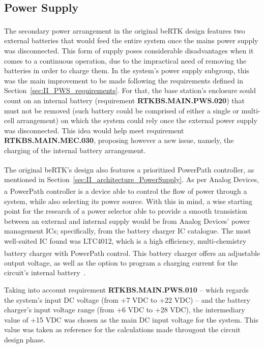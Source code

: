 \subsection{Power Supply}\label{sec:313_PowerSupply}

The secondary power arrangement in the original beRTK\textsuperscript{\textregistered} design features two external batteries that would feed the entire system once the mains power supply was disconnected. This form of supply poses considerable disadvantages when it comes to a continuous operation, due to the impractical need of removing the batteries in order to charge them. In the system's power supply subgroup, this was the main improvement to be made following the requirements defined in Section~\ref{sec:II_PWS_requirements}. For that, the base station's enclosure sould count on an internal battery (requirement \textbf{RTKBS.MAIN.PWS.020}) that must not be removed (such battery could be comprised of either a single or multi-cell arrangement) on which the system could rely once the external power supply was disconnected. This idea would help meet requirement \textbf{RTKBS.MAIN.MEC.030}, proposing however a new issue, namely, the charging of the internal battery arrangement.

The original beRTK\textsuperscript{\textregistered}'s design also features a prioritized PowerPath\textsuperscript{\texttrademark} controller, as mentioned in Section~\ref{sec:II_architecture_PowerSupply}.
As per Analog Devices, a PowerPath\textsuperscript{\texttrademark} controller is a device able to control the flow of power through a system, while also selecting its power source.
With this in mind, a wise starting point for the research of a power selector able to provide a smooth transistion between an external and internal supply would be from Analog Devices' power management ICs; specifically, from the battery charger IC catalogue. The most well-suited IC found was LTC4012, which is a high efficiency, multi-chemistry battery charger with PowerPath\textsuperscript{\texttrademark} control. This battery charger offers an adjustable output voltage, as well as the option to program a charging current for the circuit's internal battery~\cite{LTC4012}.

Taking into account requirement \textbf{RTKBS.MAIN.PWS.010} -- which regards the system's input \gls{DC} voltage (from +7 VDC to +22 VDC) -- and the battery charger's input voltage range (from +6 VDC to +28 VDC), the intermediary value of +15 VDC was chosen as the main DC input voltage for the system. This value was taken as reference for the calculations made througout the circuit design phase.

